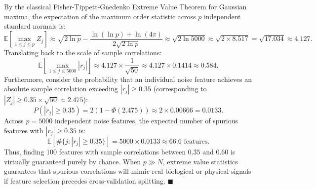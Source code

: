 \documentclass[11pt,a4paper]{article}
\begin{document}
By the classical Fisher-Tippett-Gnedenko Extreme Value Theorem for Gaussian maxima, the expectation of the maximum order statistic across $p$ independent standard normals is:
\[
  \mathbb{E}\left[ \max_{1 \le j \le p} Z_j \right] \approx \sqrt{2 \ln p} - \frac{\ln(\ln p) + \ln(4\pi)}{2\sqrt{2\ln p}} \approx \sqrt{2 \ln 5000} \approx \sqrt{2 \times 8.517} = \sqrt{17.034} \approx 4.127.
\]
Translating back to the scale of sample correlations:
\[
  \mathbb{E}\left[ \max_{1 \le j \le 5000} |r_j| \right] \approx 4.127 \times \frac{1}{\sqrt{50}} \approx 4.127 \times 0.1414 \approx 0.584.
\]
Furthermore, consider the probability that an individual noise feature achieves an absolute sample correlation exceeding $|r_j| \ge 0.35$ (corresponding to $|Z_j| \ge 0.35 \times \sqrt{50} \approx 2.475$):
\[
  P(|r_j| \ge 0.35) = 2 \left( 1 - \Phi(2.475) \right) \approx 2 \times 0.00666 = 0.0133.
\]
Across $p = 5000$ independent noise features, the expected number of spurious features with $|r_j| \ge 0.35$ is:
\[
  \mathbb{E}\left[\#\{j : |r_j| \ge 0.35\}\right] = 5000 \times 0.0133 \approx 66.6 \text{ features.}
\]
Thus, finding 100 features with sample correlations between $0.35$ and $0.60$ is virtually guaranteed purely by chance. When $p \gg N$, extreme value statistics guarantees that spurious correlations will mimic real biological or physical signals if feature selection precedes cross-validation splitting. $\blacksquare$
\end{document}
